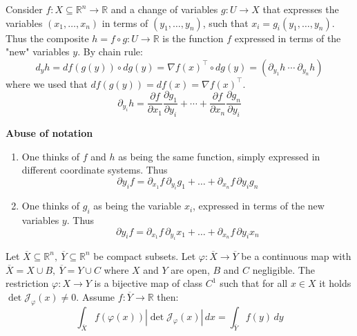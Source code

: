 \documentclass[a4paper, 10pt]{article}
\theoremstyle{definition}
\newcommand{\R}{\mathbb{R}}
\newcommand{\J}{\mathcal{J}}
\begin{document}


\begin{ntheorem*}
    Consider \(f: X \subseteq \R^n \to \R\) and a change of variables \(g: U \to X\) that expresses the variables \((x_1, \ldots, x_n)\) in terms of \((y_1, \ldots, y_n)\), such that \(x_i = g_i(y_1, \ldots, y_n)\). Thus the composite \(h = f \circ g: U \to \R\) is the function \(f\) expressed in terms of the "new" variables \(y\). By chain rule:
    \[d_{y}h = df(g(y)) \circ dg(y) = \nabla f(x)^\top \circ dg(y) = (\partial_{y_1}h \ \cdots \ \partial_{y_n}h)\]
    where we used that \(df(g(y)) = df(x) = \nabla f(x)^\top\).
    \[\partial_{y_i} h = \frac{\partial f}{\partial x_1} \frac{\partial g_1}{\partial y_i} + \cdots + \frac{\partial f}{\partial x_n} \frac{\partial g_n}{\partial y_i}\]

    \textbf{Abuse of notation}
    \begin{enumerate}[leftmargin=15pt]
        \item One thinks of \(f\) and \(h\) as being the same function, simply expressed in different coordinate systems. Thus
        \[\partial y_i f = \partial_{x_1}f \, \partial_{y_i}g_1 + \ldots + \partial_{x_n}f \, \partial{y_i}g_n\]
        \item One thinks of \(g_i\) as being the variable \(x_i\), expressed in terms of the new variables \(y\). Thus
        \[\partial y_i f = \partial_{x_1}f \, \partial_{y_i}x_1 + \ldots + \partial_{x_n}f \, \partial{y_i}x_n\]
    \end{enumerate}
\end{ntheorem*}

\begin{ntheorem*}
    Let \(\overline{X} \subseteq \R^n, \ \overline{Y} \subseteq \R^n\) be compact subsets. Let \(\varphi: \overline{X} \to \overline{Y}\) be a continuous map with \(\overline{X} = X \cup B, \ \overline{Y} = Y \cup C\) where \(X\) and \(Y\) are open, \(B\) and \(C\) negligible. The restriction \(\varphi: X \to Y\) is a bijective map of class \(C^1\) such that for all \(x \in X\) it holds \(\det \J_\varphi(x) \neq 0\). Assume \(f: \overline{Y} \to \R\) then:
    \[\int_{\overline{X}} f(\varphi(x)) \left|\det \J_\varphi(x)\right| \,dx = \int_{\overline{Y}} f(y) \,dy\]
\end{ntheorem*}
\end{document}
